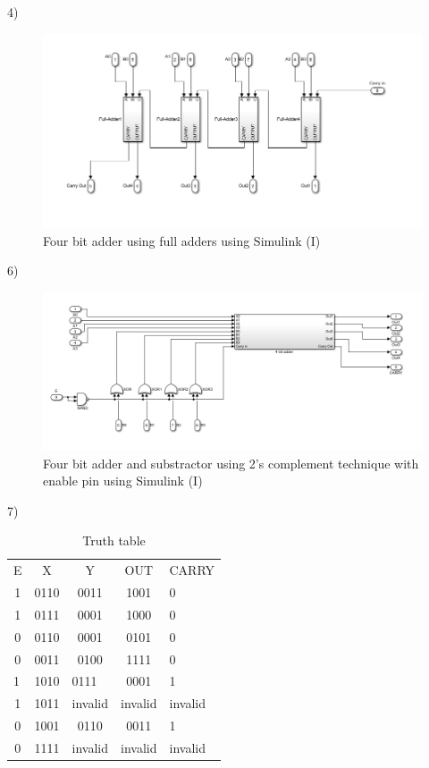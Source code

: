 \documentclass[11pt]{report}
\begin{document}
4)
\begin{figure}[H]
  \includegraphics[width=\linewidth]{fourbitadder}
  \caption{Four bit adder using full adders using Simulink (I)}
  \label{fig:zero}
\end{figure}

6)
\begin{figure}[H]
  \includegraphics[width=\linewidth]{design}
  \caption{Four bit adder and substractor using 2's complement technique with enable pin using Simulink (I)}
  \label{fig:zero}
\end{figure}

7)
\begin{table}[]
\centering
\caption{Truth table}
\label{my-label}
\begin{tabular}{ccccl}
E                     & X                        & Y                        & OUT     & CARRY   \\
1                     & 0110                     & 0011                     & 1001    & 0       \\
1                     & 0111                     & 0001                     & 1000    & 0       \\
0                     & 0110                     & 0001                     & 0101    & 0       \\
0                     & 0011                     & 0100                     & 1111    & 0       \\
\multicolumn{1}{l}{1} & \multicolumn{1}{l}{1010} & \multicolumn{1}{l}{0111} & 0001    & 1       \\
1                     & 1011                     & invalid                  & invalid & invalid \\
0                     & 1001                     & 0110                     & 0011    & 1       \\
0                     & 1111                     & invalid                  & invalid & invalid
\end{tabular}
\end{table}
\end{document}
